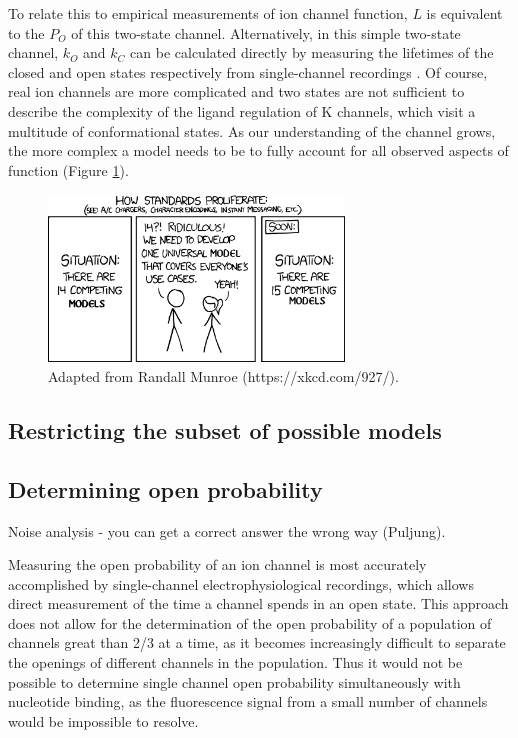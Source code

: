 To relate this to empirical measurements of ion channel function, $L$ is equivalent to the $P_O$ of this two-state channel.
Alternatively, in this simple two-state channel, $k_O$ and $k_C$ can be calculated directly by measuring the lifetimes of the closed and open states respectively from single-channel recordings \cite{reinhold_penner_auth_single-channel_1995, sivilotti_praise_2016}.
Of course, real ion channels are more complicated and two states are not sufficient to describe the complexity of the ligand regulation of K\ATP{} channels, which visit a multitude of conformational states.
As our understanding of the channel grows, the more complex a model needs to be to fully account for all observed aspects of function (Figure \ref{ch4fig:standards}).

\begin{figure}[h]
	\centering
	\includegraphics[width=0.7\textwidth]{xkcd_standards.png}
	\caption{
	Adapted from Randall Munroe (https://xkcd.com/927/).
	}\label{ch4fig:standards}
\end{figure}

\subsection{Restricting the subset of possible models}


\subsection{Determining open probability}
Noise analysis - you can get a correct answer the wrong way (Puljung).

Measuring the open probability of an ion channel is most accurately accomplished by single-channel electrophysiological recordings, which allows direct measurement of the time a channel spends in an open state.
This approach does not allow for the determination of the open probability of a population of channels great than 2/3 at a time, as it becomes increasingly difficult to separate the openings of different channels in the population.
Thus it would not be possible to determine single channel open probability simultaneously with nucleotide binding, as the fluorescence signal from a small number of channels would be impossible to resolve.

